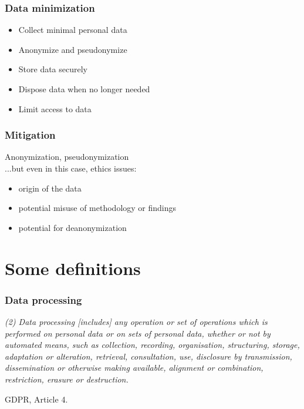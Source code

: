 \documentclass[17pt,aspectratio=169,hyperref={pdfusetitle,colorlinks,allcolors=olive}]{beamer}
\begin{document}
\begin{frame}[fragile]
  \frametitle{Data minimization}

  \begin{itemize}
  \item Collect minimal personal data
  \item Anonymize and pseudonymize
  \item Store data securely
  \item Dispose data when no longer needed
  \item Limit access to data
  \end{itemize}
\end{frame}

\begin{frame}[fragile]
  \frametitle{Mitigation}

  Anonymization, pseudonymization \\
  \vspace{.5cm}
  ...but even in this case, ethics issues: \\

  \begin{itemize}
  \item origin of the data
  \item potential misuse of methodology or findings
  \item potential for deanonymization
  \end{itemize}
\end{frame}

\section{Some definitions}

\begin{frame}[fragile]
  \frametitle{Data processing}

  {\small
    {\em
    (2) Data processing [includes] any operation or set of operations which is performed  on  personal  data  or  on  sets  of  personal  data,  whether  or  not  by  automated  means,  such  as collection,  recording,  organisation,  structuring,  storage,  adaptation  or  alteration,  retrieval,  consultation, use,  disclosure  by  transmission,  dissemination  or  otherwise  making  available,  alignment  or  combination, restriction, erasure or destruction.
    }
  \begin{flushright}
    GDPR, Article 4.
  \end{flushright}
  }
  
\end{frame}
\end{document}
